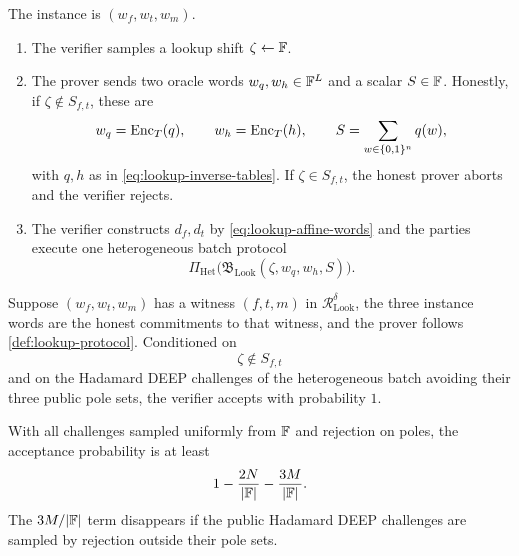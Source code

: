 \begin{definition}
\label{def:lookup-protocol}
The instance is $(w_f,w_t,w_m)$.
\begin{enumerate}[label=\textnormal{\arabic*.},leftmargin=*]
  \item The verifier samples a lookup shift $\zeta\leftarrow\mathbb{F}$.

  \item The prover sends two oracle words $w_q,w_h\in\mathbb{F}^L$ and a scalar $S\in\mathbb{F}$.  Honestly, if $\zeta\notin S_{f,t}$, these are
  \begin{equation}
    w_q=\operatorname{Enc}_T(q),
    \qquad
    w_h=\operatorname{Enc}_T(h),
    \qquad
    S=\sum_{w\in\{0,1\}^n}q(w),
    \label{eq:lookup-honest-messages}
  \end{equation}
  with $q,h$ as in \eqref{eq:lookup-inverse-tables}.  If $\zeta\in S_{f,t}$, the honest prover aborts and the verifier rejects.

  \item The verifier constructs $d_f,d_t$ by \eqref{eq:lookup-affine-words} and the parties execute one heterogeneous batch protocol
  \begin{equation}
    \Pi_{\mathrm{Het}}
    \bigl(\mathfrak B_{\mathrm{Look}}(\zeta,w_q,w_h,S)\bigr).
    \label{eq:lookup-run-heterogeneous}
  \end{equation}
\end{enumerate}
\end{definition}

\begin{theorem}
\label{thm:lookup-completeness}
Suppose $(w_f,w_t,w_m)$ has a witness $(f,t,m)$ in $\mathcal R^{\delta}_{\mathrm{Look}}$, the three instance words are the honest commitments to that witness, and the prover follows \cref{def:lookup-protocol}.  Conditioned on
\begin{equation}
  \zeta\notin S_{f,t}
  \label{eq:lookup-nonpole-shift}
\end{equation}
and on the Hadamard DEEP challenges of the heterogeneous batch avoiding their three public pole sets, the verifier accepts with probability $1$.

With all challenges sampled uniformly from $\mathbb{F}$ and rejection on poles, the acceptance probability is at least
\begin{equation}
  1-\frac{2N}{|\mathbb{F}|}-\frac{3M}{|\mathbb{F}|}.
  \label{eq:lookup-completeness-bound}
\end{equation}
The $3M/|\mathbb{F}|$ term disappears if the public Hadamard DEEP challenges are sampled by rejection outside their pole sets.
\end{theorem}

